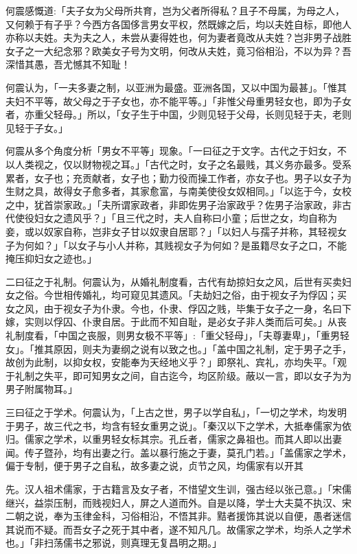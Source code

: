 何震感慨道:「夫子女为父母所共育，岂为父者所得私？且子不母属，为母之人，又何赖于有子乎？今西方各国侈言男女平权，然既嫁之后，均以夫姓自标，即他人亦称以夫姓。夫为夫之人，未尝从妻得姓也，何为妻者竟改从夫姓？岂非男子战胜女子之一大纪念邪？欧美女子号为文明，何改从夫姓，竟习俗相沿，不以为异？吾深惜其愚，吾尤憾其不知耻！


何震认为，「一夫多妻之制，以亚洲为最盛。亚洲各国，又以中国为最甚」。「惟其夫妇不平等，故父母之于子女也，亦不能平等。」「非惟父母重男轻女也，即为子女者，亦重父轻母。」所以，「女子生于中国，少则见轻于父母，长则见轻于夫，老则见轻于子女。」

何震从多个角度分析「男女不平等」现象。「一曰征之于文字。古代之于妇女，不以人类视之，仅以财物视之耳。」「古代之时，女子之名最贱，其义务亦最多。受系累者，女子也；充贡献者，女子也；勤力役而操工作者，亦女子也。男子以女子为生财之具，故得女子愈多者，其家愈富，与南美使役女奴相同。」「以迄于今，女校之中，犹首崇家政。」「夫所谓家政者，非即佐男子治家政乎？佐男子治家政，非古代使役妇女之遗风乎？」「且三代之时，夫人自称曰小童；后世之女，均自称为妾，或以奴家自称，岂非女子甘以奴隶自居耶？」「以妇人与孺子并称，其轻视女子为何如？」「以女子与小人并称，其贱视女子为何如？是虽籍尽女子之口，不能掩压抑妇女之迹也。」

二曰征之于礼制。何震认为，从婚礼制度看，古代有劫掠妇女之风，后世有买卖妇女之俗。今世相传婚礼，均可窥见其遗风。「夫劫妇之俗，由于视女子为俘囚；买女之风，由于视女子为仆隶。今也，仆隶、俘囚之贱，毕集于女子之一身，名曰下嫁，实则以俘囚、仆隶自居。于此而不知自耻，是必女子非人类而后可矣。」从丧礼制度看，「中国之丧服，则男女极不平等」:「重父轻母」，「夫尊妻卑」，「重男轻女」。「推其原因，则夫为妻纲之说有以致之也。」「盖中国之礼制，定于男子之手，故创为此制，以抑女权，安能奉为天经地义乎？」即祭礼、宾礼，亦均失平。「观于礼制之失平，即可知男女之间，自古迄今，均区阶级。蔽以一言，即以女子为为男子附属物耳。」

三曰征之于学术。何震认为，「上古之世，男子以学自私」，「一切之学术，均发明于男子，故三代之书，均含有轻女重男之说」。「秦汉以下之学术，大抵奉儒家为依归。儒家之学术，以重男轻女标其宗。孔丘者，儒家之鼻祖也。而其人即以出妻闻。传子暨孙，均有出妻之行。盖以暴行施之于妻，莫孔门若。」「盖儒家之学术，偏于专制，便于男子之自私，故多妻之说，贞节之风，均儒家有以开其


\noindent 先。汉人祖术儒家，于古籍言及女子者，不惜望文生训，强古经以张己意。」「宋儒继兴，益崇压制，而贱视妇人，屏之人道而外。自是以降，学士大夫莫不执汉、宋二朝之说，奉为玉律金科，习俗相沿，不悟其非。黠者援饰其说以自便，愚者迷信其说而不疑。而吾女子之死于其中者，遂不知凡几。故儒家之学术，均杀人之学术也。」「非扫荡儒书之邪说，则真理无复昌明之期。」

